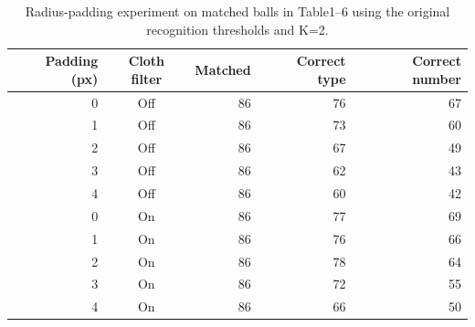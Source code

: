 \begin{table}[htbp]
\centering
\small
\caption{Radius-padding experiment on matched balls in Table1--6 using the original recognition thresholds and K=2.}
\label{tab:radius-padding-results}
\begin{tabular}{rcrrr}
\toprule
Padding (px) & Cloth filter & Matched & Correct type & Correct number \\
\midrule
0 & Off & 86 & 76 & 67 \\
1 & Off & 86 & 73 & 60 \\
2 & Off & 86 & 67 & 49 \\
3 & Off & 86 & 62 & 43 \\
4 & Off & 86 & 60 & 42 \\
0 & On & 86 & 77 & 69 \\
1 & On & 86 & 76 & 66 \\
2 & On & 86 & 78 & 64 \\
3 & On & 86 & 72 & 55 \\
4 & On & 86 & 66 & 50 \\
\bottomrule
\end{tabular}
\end{table}
\FloatBarrier
